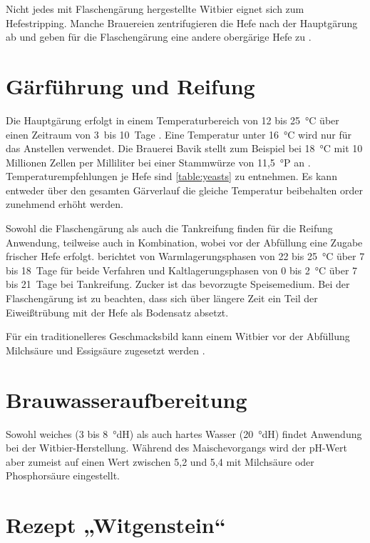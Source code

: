 \documentclass[a4paper,parskip=half]{scrartcl}
\begin{document}
Nicht jedes mit Flaschengärung hergestellte Witbier eignet sich zum
Hefestripping. Manche Brauereien zentrifugieren die Hefe nach
der Hauptgärung ab und geben für die Flaschengärung eine
andere obergärige Hefe zu \parencite[43]{Strottner1999}.

\section*{Gärführung und Reifung}

Die Hauptgärung erfolgt in einem Temperaturbereich von 12 bis 25~°C
über einen Zeitraum von 3~bis 10~Tage \parencite[13,18]{Strottner1999}.
Eine Temperatur unter 16~°C wird nur für das Anstellen verwendet.
Die Brauerei Bavik stellt zum Beispiel bei 18~°C mit 10 Millionen Zellen
per Milliliter bei einer Stammwürze von 11,5~°P an \parencite[63]{Hieronymus2010}.
Temperaturempfehlungen je Hefe sind \autoref{table:yeasts} zu entnehmen.
Es kann entweder über den gesamten Gärverlauf die gleiche Temperatur
beibehalten order zunehmend erhöht werden.

Sowohl die Flaschengärung als auch die Tankreifung finden für die Reifung
Anwendung, teilweise auch in Kombination, wobei vor der Abfüllung eine
Zugabe frischer Hefe erfolgt. \citeauthor{Strottner1999} berichtet
von Warmlagerungsphasen von 22 bis 25~°C über 7 bis 18~Tage für beide
Verfahren und Kaltlagerungsphasen von 0 bis 2~°C über 7 bis 21~Tage
bei Tankreifung. Zucker ist das bevorzugte Speisemedium. Bei der Flaschengärung
ist zu beachten, dass sich über längere Zeit ein Teil der Eiweißtrübung
mit der Hefe als Bodensatz absetzt. \parencite[13\psq,18]{Strottner1999}

Für ein traditionelleres Geschmacksbild kann einem Witbier vor
der Abfüllung Milchsäure und Essigsäure zugesetzt werden
\parencite[18]{Strottner1999}.

\section*{Brauwasseraufbereitung}

Sowohl weiches (3 bis 8~°dH) als auch hartes Wasser (20~°dH) findet
Anwendung bei der Witbier-Herstellung. Während des Maischevorgangs
wird der pH-Wert aber zumeist auf einen Wert zwischen 5,2 und
5,4 mit Milchsäure oder Phosphorsäure eingestellt. \parencite[14]{Strottner1999}

\section*{Rezept „Witgenstein“}
\end{document}

